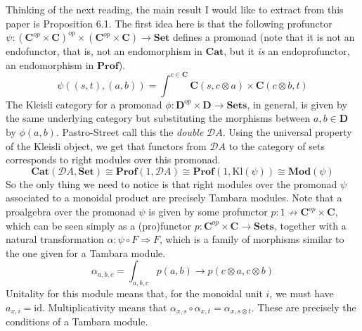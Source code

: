 \documentclass{amsart}
\begin{document}
Thinking of the next reading, the main result I would like to extract
from this paper is Proposition 6.1.  The first idea here is that the
following profunctor $\psi \colon (\mathbf{C}^{op} \times \mathbf{C})^{op}
\times (\mathbf{C}^{op} \times \mathbf{C}) \to \mathbf{Set}$ defines a promonad
(note that it is not an endofunctor, that is, not an endomorphism in $\mathbf{Cat}$,
but it \emph{is} an endoprofunctor, an endomorphism in $\mathbf{Prof}$).
\[
\psi((s,t),(a,b)) = \int^{c \in \mathbf{C}} \mathbf{C}(s , c \otimes a) \times \mathbf{C}(c \otimes b , t)
\]
The Kleisli category for a promonad
$\phi \colon \mathbf{D}^{op} \times \mathbf{D} \to \mathbf{Sets}$, in general, is
given by the same underlying category but substituting the morphisms between
$a,b \in \mathbf{D}$ by $\phi(a,b)$.  Pastro-Street call this the \emph{double} $\mathcal{D}A$.
Using the universal property of the Kleisli object, we get that
functors from $\mathcal{D}A$ to the category of sets corresponds to right modules
over this promonad.
\[\mathbf{Cat}( \mathcal{D}A , \mathbf{Set}) \cong
\mathbf{Prof}(1, \mathcal{D}A) \cong
\mathbf{Prof}(1, \mathrm{Kl}(\psi)) \cong
\mathbf{Mod}(\psi)
\]
So the only thing we need to notice is that right modules over the
promonad $\psi$ associated to a monoidal product are precisely Tambara
modules. Note that a proalgebra over the promonad $\psi$ is given by some profunctor
$p \colon 1 \nrightarrow \mathbf{C}^{op} \times \mathbf{C}$, which can be seen simply as a (pro)functor $p \colon \mathbf{C}^{op} \times \mathbf{C} \to \mathbf{Sets}$, together
with a natural transformation $\alpha \colon \psi \circ F \Rightarrow F$, which is a family of morphisms
similar to the one given for a Tambara module.
\[
\alpha_{a,b,c} = \int_{a,b,c} p(a,b) \to p(c \otimes a, c \otimes b)
\]
Unitality for this module means that, for the monoidal unit $i$, we must
have $a_{x,i} = \mathrm{id}$.  Multiplicativity means that $\alpha_{x,s} \circ \alpha_{x,t} = \alpha_{x,s \otimes t}$.
These are precisely the conditions of a Tambara module.
\end{document}
